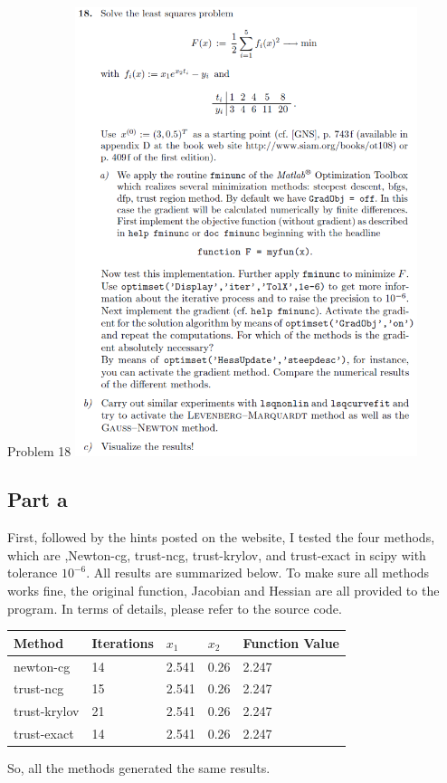 \documentclass[10pt]{article}
\begin{document}
\begin{section}{Problem 18}
	\includegraphics[width=10cm]{img/problem18.png}
	\subsection{Part a}
	First, followed by the hints posted on the website, I tested the four methods, which are ,Newton-cg, trust-ncg, trust-krylov, and trust-exact in scipy with tolerance $10^{-6}$. All results are summarized below. To make sure all methods works fine, the original function, Jacobian and Hessian are all provided to the program. In terms of details, please refer to the source code. 

    	\begin{tabular}{lllll}
    		\hline
    		Method &Iterations & $x_1$ & $x_2$& Function Value \\
    		\hline\hline
			newton-cg  & 14  & 2.541  & 0.26& 2.247    \\
			trust-ncg       & 15   & 2.541  & 0.26 & 2.247    \\
			trust-krylov    & 21   & 2.541  & 0.26 & 2.247 \\
			trust-exact     & 14  & 2.541  & 0.26 & 2.247    
    	 \end{tabular}
     
    So, all the methods generated the same results.  

\end{section}
\end{document}
